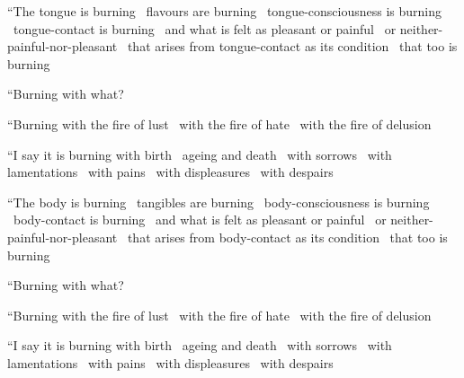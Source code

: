 \begin{english-only-hang}
  ``The tongue is burning \breathmark\ flavours are burning \breathmark\ tongue-consciousness is burning \breathmark\ tongue-contact is burning \breathmark\ and what is felt as pleasant or painful \breathmark\ or neither-painful-nor-pleasant \breathmark\ that arises from tongue-contact as its condition \breathmark\ that too is burning
\end{english-only-hang}
\begin{english-only-hangtogether}
  ``Burning with what?
\end{english-only-hangtogether}
\begin{english-only-hangtogether}
 ``Burning with the fire of lust \breathmark\ with the fire of hate \breathmark\ with the fire of delusion
\end{english-only-hangtogether}
\begin{english-only-hangtogether}
  ``I say it is burning with birth \breathmark\ ageing and death \breathmark\ with sorrows \breathmark\ with lamentations \breathmark\ with pains \breathmark\ with displeasures \breathmark\ with despairs
\end{english-only-hangtogether}

\begin{english-only-hang}
  ``The body is burning \breathmark\ tangibles are burning \breathmark\ body-consciousness is burning \breathmark\ body-contact is burning \breathmark\ and what is felt as pleasant or painful \breathmark\ or neither-painful-nor-pleasant \breathmark\ that arises from body-contact as its condition \breathmark\ that too is burning
\end{english-only-hang}
\begin{english-only-hangtogether}
  ``Burning with what?
\end{english-only-hangtogether}
\begin{english-only-hangtogether}
  ``Burning with the fire of lust \breathmark\ with the fire of hate \breathmark\ with the fire of delusion
\end{english-only-hangtogether}
\begin{english-only-hangtogether}
  ``I say it is burning with birth \breathmark\ ageing and death \breathmark\ with sorrows \breathmark\ with lamentations \breathmark\ with pains \breathmark\ with displeasures \breathmark\ with despairs
\end{english-only-hangtogether}

